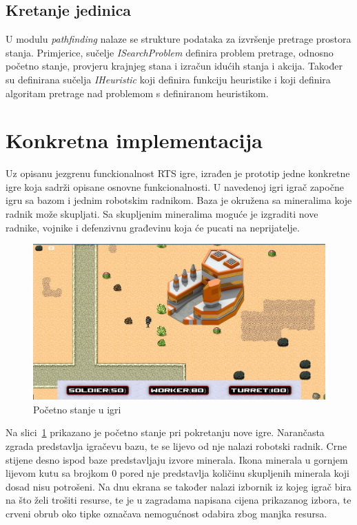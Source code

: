 \documentclass[times, utf8, zavrsni, numeric]{fer}
\begin{document}
\subsection{Kretanje jedinica}

\par U modulu \textit{pathfinding} nalaze se strukture podataka za izvršenje pretrage prostora stanja.
Primjerice, sučelje \textit{ISearchProblem} definira problem pretrage, odnosno početno stanje, provjeru krajnjeg stana i izračun idućih stanja i akcija. 
Također su definirana sučelja \textit{IHeuristic} koji definira funkciju heuristike i  koji definira algoritam pretrage nad problemom s definiranom heuristikom.

\section{Konkretna implementacija}

\par Uz opisanu jezgrenu funckionalnost RTS igre, izrađen je prototip jedne konkretne igre koja sadrži opisane osnovne funkcionalnosti.
U navedenoj igri igrač započne igru sa bazom i jednim robotskim radnikom.
Baza je okružena sa mineralima koje radnik može skupljati.
Sa skupljenim mineralima moguće je izgraditi nove radnike, vojnike i defenzivnu građevinu koja će pucati na neprijatelje.

\begin{figure}[h]
	\centering
	\includegraphics[width=0.8\linewidth]{images/gameStartScreenshot.png}
	\caption{Početno stanje u igri}
	\label{fig:gameStart}
\end{figure}

\par Na slici~\ref{fig:gameStart} prikazano je početno stanje pri pokretanju nove igre.
Narančasta zgrada predstavlja igračevu bazu, te se lijevo od nje nalazi robotski radnik.
Crne stijene desno ispod baze predstavljaju izvore minerala.
Ikona minerala u gornjem lijevom kutu sa brojkom 0 pored nje predstavlja količinu skupljenih minerala koji dosad nisu potrošeni.
Na dnu ekrana se također nalazi izbornik iz kojeg igrač bira na što želi trošiti resurse, te je u zagradama napisana cijena prikazanog izbora, te crveni obrub oko tipke označava nemogućnost odabira zbog manjka resursa.
\end{document}
